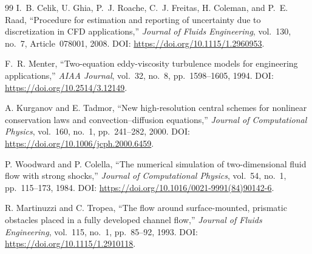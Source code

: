 \documentclass[11pt]{article}
\begin{document}
\begin{thebibliography}{99}
I.~B. Celik, U. Ghia, P.~J. Roache, C.~J. Freitas,
H. Coleman, and P.~E. Raad,
``Procedure for estimation and reporting of uncertainty
due to discretization in CFD applications,''
\textit{Journal of Fluids Engineering}, vol.~130, no.~7,
Article~078001, 2008.
DOI: \url{https://doi.org/10.1115/1.2960953}.

F.~R. Menter,
``Two-equation eddy-viscosity turbulence models for engineering
applications,''
\textit{AIAA Journal}, vol.~32, no.~8, pp.~1598--1605, 1994.
DOI: \url{https://doi.org/10.2514/3.12149}.

A. Kurganov and E. Tadmor,
``New high-resolution central schemes for nonlinear conservation
laws and convection--diffusion equations,''
\textit{Journal of Computational Physics}, vol.~160, no.~1,
pp.~241--282, 2000.
DOI: \url{https://doi.org/10.1006/jcph.2000.6459}.

P. Woodward and P. Colella,
``The numerical simulation of two-dimensional fluid flow with
strong shocks,''
\textit{Journal of Computational Physics}, vol.~54, no.~1,
pp.~115--173, 1984.
DOI: \url{https://doi.org/10.1016/0021-9991(84)90142-6}.

R. Martinuzzi and C. Tropea,
``The flow around surface-mounted, prismatic obstacles placed in a
fully developed channel flow,''
\textit{Journal of Fluids Engineering}, vol.~115, no.~1,
pp.~85--92, 1993.
DOI: \url{https://doi.org/10.1115/1.2910118}.

\end{thebibliography}
\end{document}

